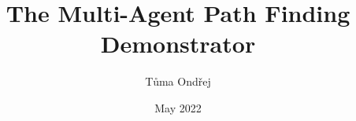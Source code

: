 \worktype [O/EN]
\title {The Multi-Agent Path Finding Demonstrator}
\author {Tůma Ondřej}
\supervisor {\kulich}
\date {May 2022}